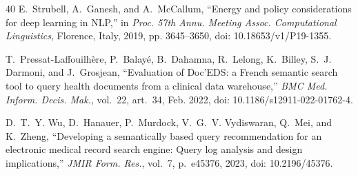 \documentclass[journal,twoside,web]{ieeecolor}
\begin{document}
\begin{thebibliography}{40}
E.~Strubell, A.~Ganesh, and A.~McCallum, ``Energy and policy considerations for
deep learning in NLP,'' in \emph{Proc. 57th Annu. Meeting Assoc. Computational
Linguistics}, Florence, Italy, 2019, pp. 3645--3650,
doi: 10.18653/v1/P19-1355.

T.~Pressat-Laffouilh\`{e}re, P.~Balay\'{e}, B.~Dahamna, R.~Lelong, K.~Billey,
S.~J. Darmoni, and J.~Grosjean, ``Evaluation of Doc'EDS: a French semantic search
tool to query health documents from a clinical data warehouse,''
\emph{BMC Med. Inform. Decis. Mak.}, vol.~22, art.~34, Feb. 2022,
doi: 10.1186/s12911-022-01762-4.

D.~T.~Y. Wu, D.~Hanauer, P.~Murdock, V.~G.~V. Vydiswaran, Q.~Mei, and K.~Zheng,
``Developing a semantically based query recommendation for an electronic medical
record search engine: Query log analysis and design implications,''
\emph{JMIR Form. Res.}, vol.~7, p.~e45376, 2023, doi: 10.2196/45376.

\end{thebibliography}


\end{document}
